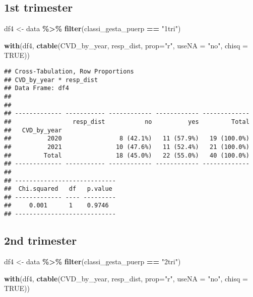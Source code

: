 \documentclass[
]{article}
\newenvironment{Shaded}{\begin{snugshade}}{\end{snugshade}}
\newcommand{\AttributeTok}[1]{\textcolor[rgb]{0.13,0.29,0.53}{#1}}
\newcommand{\ConstantTok}[1]{\textcolor[rgb]{0.56,0.35,0.01}{#1}}
\newcommand{\FunctionTok}[1]{\textcolor[rgb]{0.13,0.29,0.53}{\textbf{#1}}}
\newcommand{\NormalTok}[1]{#1}
\newcommand{\OtherTok}[1]{\textcolor[rgb]{0.56,0.35,0.01}{#1}}
\newcommand{\SpecialCharTok}[1]{\textcolor[rgb]{0.81,0.36,0.00}{\textbf{#1}}}
\newcommand{\StringTok}[1]{\textcolor[rgb]{0.31,0.60,0.02}{#1}}
\begin{document}
\hypertarget{st-trimester-1}{%
\subsection{1st trimester}\label{st-trimester-1}}

\begin{Shaded}
\begin{Highlighting}[]
\NormalTok{df4 }\OtherTok{\textless{}{-}}\NormalTok{ data }\SpecialCharTok{\%\textgreater{}\%} 
  \FunctionTok{filter}\NormalTok{(classi\_gesta\_puerp }\SpecialCharTok{==} \StringTok{"1tri"}\NormalTok{)}

\FunctionTok{with}\NormalTok{(df4, }\FunctionTok{ctable}\NormalTok{(CVD\_by\_year, resp\_dist, }\AttributeTok{prop=}\StringTok{"r"}\NormalTok{, }\AttributeTok{useNA =} \StringTok{"no"}\NormalTok{, }\AttributeTok{chisq =} \ConstantTok{TRUE}\NormalTok{))}
\end{Highlighting}
\end{Shaded}

\begin{verbatim}
## Cross-Tabulation, Row Proportions  
## CVD_by_year * resp_dist  
## Data Frame: df4  
## 
## 
## ------------- ----------- ------------ ------------ -------------
##                 resp_dist           no          yes         Total
##   CVD_by_year                                                    
##          2020                8 (42.1%)   11 (57.9%)   19 (100.0%)
##          2021               10 (47.6%)   11 (52.4%)   21 (100.0%)
##         Total               18 (45.0%)   22 (55.0%)   40 (100.0%)
## ------------- ----------- ------------ ------------ -------------
## 
## ----------------------------
##  Chi.squared   df   p.value 
## ------------- ---- ---------
##     0.001      1    0.9746  
## ----------------------------
\end{verbatim}

\hypertarget{nd-trimester-1}{%
\subsection{2nd trimester}\label{nd-trimester-1}}

\begin{Shaded}
\begin{Highlighting}[]
\NormalTok{df4 }\OtherTok{\textless{}{-}}\NormalTok{ data }\SpecialCharTok{\%\textgreater{}\%} 
  \FunctionTok{filter}\NormalTok{(classi\_gesta\_puerp }\SpecialCharTok{==} \StringTok{"2tri"}\NormalTok{)}

\FunctionTok{with}\NormalTok{(df4, }\FunctionTok{ctable}\NormalTok{(CVD\_by\_year,  resp\_dist, }\AttributeTok{prop=}\StringTok{"r"}\NormalTok{, }\AttributeTok{useNA =} \StringTok{"no"}\NormalTok{, }\AttributeTok{chisq =} \ConstantTok{TRUE}\NormalTok{))}
\end{Highlighting}
\end{Shaded}
\end{document}
